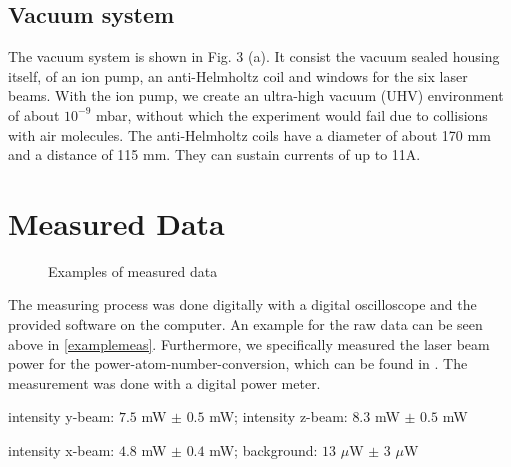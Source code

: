 \documentclass[12pt, a4paper]{article}
\begin{document}
\subsection{Vacuum system}
The vacuum system is shown in Fig. 3 (a). It consist the vacuum sealed housing itself, of an ion pump, an anti-Helmholtz coil and windows for the six laser beams. With the ion pump, we create an ultra-high vacuum (UHV) environment of about $10^{-9}$ mbar, without which the experiment would fail due to collisions with air molecules. The anti-Helmholtz coils have a diameter of about 170 mm and a distance of 115 mm. They can sustain currents of up to 11A.

\section{Measured Data}
\begin{figure}[h]
\centering
\caption{Examples of measured data}
	\label{examplemeas}
\end{figure}
The measuring process was done digitally with a digital oscilloscope and the provided software on the computer. An example for the raw data can be seen above in \autoref{examplemeas}. Furthermore, we specifically measured the laser beam power for the power-atom-number-conversion, which can be found in \cite{script}. The measurement was done with a digital power meter.

intensity y-beam: $7.5$ mW $\pm$ $0.5$ mW; intensity z-beam: $8.3$ mW $\pm$ $0.5$ mW

intensity x-beam: $4.8$ mW $\pm$ $0.4$ mW; background: $13$ $\mu$W $\pm$ $3$ $\mu$W
\end{document}
